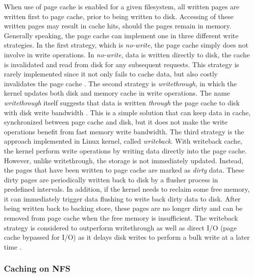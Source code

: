 When use of page cache is enabled for a given filesystem, all written pages 
are written first to page cache, prior to being written to disk.
Accessing of these written pages may result in cache hits, should the pages 
remain in memory.
Generally speaking, the page cache can implement one in three 
different write strategies.
In the first strategy, which is \textit{no-write}, the page cache simply does not 
involve in write operations. In \textit{no-write}, data is written directly to disk, 
the cache is invalidated and read from disk for any subsequent requests. 
This strategy is rarely implemented since it not only fails to cache data, 
but also costly invalidates the page cache \cite{linuxdev3rd2010}.
The second strategy is \textit{writethrough}, in which the kernel updates both 
disk and memory cache in write operations. The name \textit{writethrough} 
itself suggests that data is written \textit{through} the page cache to disk with 
disk write bandwidth \cite{linuxdev3rd2010}.
This is a simple solution that can keep data in cache, synchronized between 
page cache and disk, but it does not make the write operations benefit from 
fast memory write bandwidth. 
The third strategy is the approach implemented in Linux kernel, 
called \textit{writeback}. 
With writeback cache, the kernel perform write operations by writing data directly 
into the page cache. However, unlike writethrough, the storage is not immediately 
updated. Instead, the pages that have been written to page cache are marked 
as \textit{dirty} data. These dirty pages are periodically written back to disk by 
a flusher process in predefined intervals. 
In addition, if the kernel needs to reclaim some free memory, it can immediately 
trigger data flushing to write back dirty data to disk. 
After being written back to backing store, these pages are no longer dirty and 
can be removed from page cache when the free memory is insufficient.
The writeback strategy is considered to outperform writethrough as well as
direct I/O (page cache bypassed for I/O) as it delays disk writes to perform 
a bulk write at a later time \cite{linuxdev3rd2010}.

\subsubsection{Caching on NFS}

